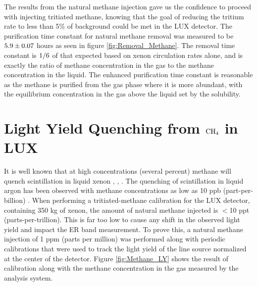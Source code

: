 The results from the natural methane injection gave us the confidence to proceed with injecting tritiated methane, knowing that the goal of reducing the tritium rate to less than 5\% of background could be met in the LUX detector. The purification time constant for natural methane removal was measured to be $\rm 5.9 \pm 0.07$ hours as seen in figure \ref{fig:Removal_Methane}. The removal time constant is $\rm 1/6$ of that expected based on xenon circulation rates alone, and is exactly the ratio of methane concentration in the gas to the methane concentration in the liquid. The enhanced purification time constant is reasonable as the methane is purified from the gas phase where it is more abundant, with the equilibrium concentration in the gas above the liquid set by the solubility.



\section{Light Yield Quenching from $\rm CH_4$ in LUX}

It is well known that at high concentrations (several percent) methane will quench scintillation in liquid xenon \cite{bondar2006two}, \cite{Kirill_Methane}, \cite{Shibamura} \cite{Xe_CH4_Theory}. The quenching of scintillation in liquid argon has been observed with methane concentrations as low as 10 ppb (part-per-billion) \cite{Ar_CH4}. When performing a tritiated-methane calibration for the LUX detector, containing 350 kg of xenon, the amount of natural methane injected is $<$10 ppt (parts-per-trillion). This is far too low to cause any shift in the observed light yield and impact the ER band measurement. To prove this, a natural methane injection of 1 ppm (parts per million) was performed along with periodic \KrCal calibrations that were used to track the light yield of the line source normalized at the center of the detector. Figure \ref{fig:Methane_LY} shows the result of \KrCal calibration along with the methane concentration in the gas measured by the analysis system.

